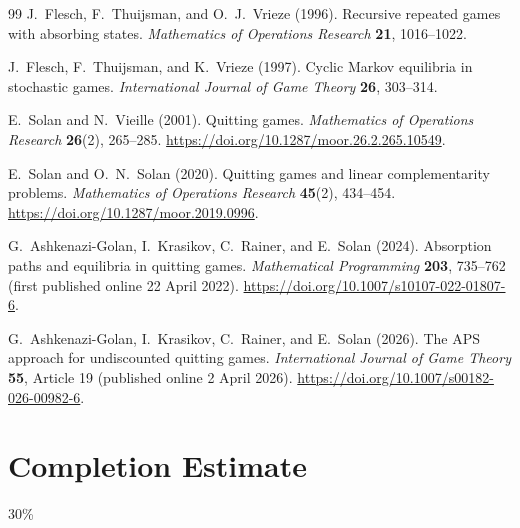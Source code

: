 \documentclass[11pt,a4paper]{article}
\numberwithin{equation}{section}
\theoremstyle{plain}
\theoremstyle{definition}
\theoremstyle{remark}
\begin{document}
\begin{thebibliography}{99}
J.~Flesch, F.~Thuijsman, and O.~J.~Vrieze (1996).
Recursive repeated games with absorbing states.
\emph{Mathematics of Operations Research} \textbf{21}, 1016--1022.

J.~Flesch, F.~Thuijsman, and K.~Vrieze (1997).
Cyclic Markov equilibria in stochastic games.
\emph{International Journal of Game Theory} \textbf{26}, 303--314.

E.~Solan and N.~Vieille (2001).
Quitting games.
\emph{Mathematics of Operations Research} \textbf{26}(2), 265--285.
\url{https://doi.org/10.1287/moor.26.2.265.10549}.

E.~Solan and O.~N.~Solan (2020).
Quitting games and linear complementarity problems.
\emph{Mathematics of Operations Research} \textbf{45}(2), 434--454.
\url{https://doi.org/10.1287/moor.2019.0996}.

G.~Ashkenazi-Golan, I.~Krasikov, C.~Rainer, and E.~Solan (2024).
Absorption paths and equilibria in quitting games.
\emph{Mathematical Programming} \textbf{203}, 735--762
(first published online 22 April 2022).
\url{https://doi.org/10.1007/s10107-022-01807-6}.

G.~Ashkenazi-Golan, I.~Krasikov, C.~Rainer, and E.~Solan (2026).
The APS approach for undiscounted quitting games.
\emph{International Journal of Game Theory} \textbf{55}, Article 19
(published online 2 April 2026).
\url{https://doi.org/10.1007/s00182-026-00982-6}.
\end{thebibliography}

\section{Completion Estimate}
30\%
\end{document}

